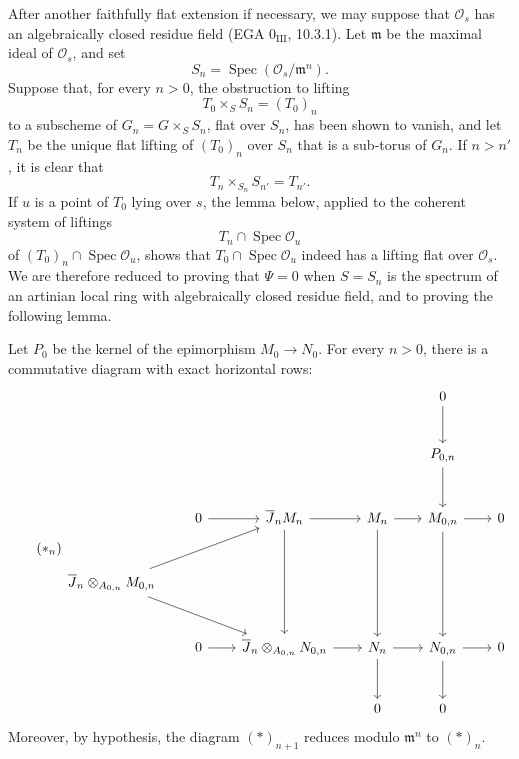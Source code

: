After another faithfully flat extension if necessary, we may suppose
that \(\mathcal O_s\) has an algebraically closed residue field
(EGA \(0_{\mathrm{III}}\), 10.3.1). Let \(\mathfrak m\) be the maximal
ideal of \(\mathcal O_s\), and set
\[
  S_n=\operatorname{Spec}(\mathcal O_s/\mathfrak m^n).
\]
Suppose that, for every \(n>0\), the obstruction to lifting
\[
  T_0\times_S S_n=(T_0)_n
\]
to a subscheme of \(G_n=G\times_S S_n\), flat over \(S_n\), has been
shown to vanish, and let \(T_n\) be the unique flat lifting of
\((T_0)_n\) over \(S_n\) that is a sub-torus of \(G_n\). If
\(n>n'\), it is clear that
\[
  T_n\times_{S_n}S_{n'}=T_{n'}.
\]
If \(u\) is a point of \(T_0\) lying over \(s\), the lemma below,
applied to the coherent system of liftings
\[
  T_n\cap\operatorname{Spec}\mathcal O_u
\]
of
\((T_0)_n\cap\operatorname{Spec}\mathcal O_u\), shows that
\(T_0\cap\operatorname{Spec}\mathcal O_u\) indeed has a lifting flat
over \(\mathcal O_s\). We are therefore reduced to proving that
\(\Psi=0\) when \(S=S_n\) is the spectrum of an artinian local ring
with algebraically closed residue field, and to proving the following
lemma.


Let \(P_0\) be the kernel of the epimorphism \(M_0\to N_0\). For every
\(n>0\), there is a commutative diagram with exact horizontal rows:
\[
\tag{$\ast_n$}\label{sga3:xv:lemma:2-8:equation:ast-n}
\begin{tikzcd}[column sep=2em,row sep=large]
&&&& 0 \arrow[d] & \\
&&&& P_{0,n} \arrow[d] & \\
& 0 \arrow[r]
  & \overline{J}_nM_n \arrow[r] \arrow[dd]
  & M_n \arrow[r] \arrow[dd]
  & M_{0,n} \arrow[r] \arrow[dd] & 0 \\
\overline{J}_n\otimes_{A_{0,n}}M_{0,n}
      \arrow[urr] \arrow[drr] &&&&& \\
& 0 \arrow[r]
  & \overline{J}_n\otimes_{A_{0,n}}N_{0,n} \arrow[r]
  & N_n \arrow[r] \arrow[d]
  & N_{0,n} \arrow[r] \arrow[d] & 0 \\
&&& 0 & 0 &
\end{tikzcd}
\]
Moreover, by hypothesis, the diagram \((\ast)_{n+1}\) reduces modulo
\(\mathfrak m^n\) to \((\ast)_n\).

